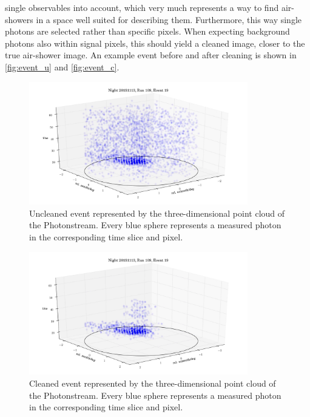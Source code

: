 single observables into account, which very much represents a way to find
air-showers in a space well suited for describing them. Furthermore, this way
single photons are selected rather than specific pixels. When expecting
background photons also within signal pixels, this should yield a cleaned image,
closer to the true air-shower image. An example event before and after cleaning
is shown in \autoref{fig:event_u} and \autoref{fig:event_c}.
%
%
%
\begin{figure}
  \centering
  \includegraphics[width=0.85\textwidth]{Plots/event2.png}
  \caption{Uncleaned event represented by the three-dimensional point cloud of the Photonstream. Every blue sphere represents a measured photon in the corresponding time slice and pixel.}
  \label{fig:event_u}
\end{figure}
\begin{figure}
  \centering
  \includegraphics[width=0.85\textwidth]{Plots/event1.png}
  \caption{Cleaned event represented by the three-dimensional point cloud of the Photonstream. Every blue sphere represents a measured photon in the corresponding time slice and pixel.}
  \label{fig:event_c}
\end{figure}
%

